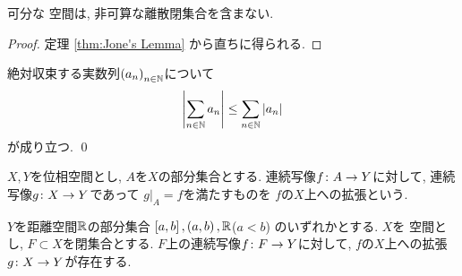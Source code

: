 \documentclass[uplatex, dvipdfmx, a4paper, 12pt, class=jsbook, crop=false]{standalone}
\begin{document}
\begin{corollary}
	\label{coro:Corollary of Jone's Lamma}
	可分な  空間は, 非可算な離散閉集合を含まない.
\end{corollary}

\begin{proof}
	定理 \ref{thm:Jone's Lemma} から直ちに得られる.
\end{proof}

\begin{proposition}
	\label{t400005}
	絶対収束する実数列\( \lrparen{a_n}_{n \in \N} \)について
	\[ \left|\sum_{n \in \mathbb{N}} a_n\right|
	\leq \sum_{n \in \mathbb{N}} \left|a_n\right| \]
	が成り立つ.
	\qed
\end{proposition}

\begin{definition}
	\( X, Y \)を位相空間とし, \( A \)を\( X \)の部分集合とする.
	連続写像\( f\colon A\to Y \)に対して,
	連続写像\( g\colon X\to Y \)であって
	\( g|_A = f \)を満たすものを
	\( f \)の\( X \)上への拡張という.
\end{definition}

\begin{theorem}
	\label{t400004}
	\( Y \)を距離空間\( \mathbb{R} \)の部分集合
	\( \left[ a , b \right], \left( a , b \right), \mathbb{R} \)(\( a < b \))
	のいずれかとする.
	\( X \)を  空間とし, \( F \subset X \)を閉集合とする.
	\( F \)上の連続写像\( f\colon F\to Y \)に対して,
	\( f \)の\( X \)上への拡張\( g\colon X\to Y \)が存在する.
\end{theorem}
\end{document}
